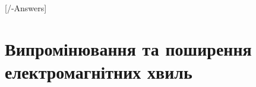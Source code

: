 
[\currfilebase/\currfilebase-Answers]
\chapter{Випромінювання та \mbox{поширення} електромагнітних хвиль}\label{\currfilebase}

